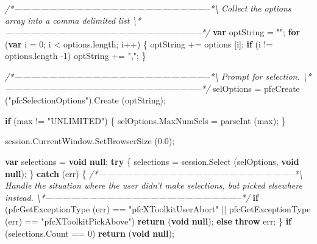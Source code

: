 \documentclass[]{article}
\newenvironment{Shaded}{}{}
\newcommand{\KeywordTok}[1]{\textcolor[rgb]{0.00,0.44,0.13}{\textbf{{#1}}}}
\newcommand{\DecValTok}[1]{\textcolor[rgb]{0.25,0.63,0.44}{{#1}}}
\newcommand{\FloatTok}[1]{\textcolor[rgb]{0.25,0.63,0.44}{{#1}}}
\newcommand{\StringTok}[1]{\textcolor[rgb]{0.25,0.44,0.63}{{#1}}}
\newcommand{\CommentTok}[1]{\textcolor[rgb]{0.38,0.63,0.69}{\textit{{#1}}}}
\newcommand{\OtherTok}[1]{\textcolor[rgb]{0.00,0.44,0.13}{{#1}}}
\newcommand{\FunctionTok}[1]{\textcolor[rgb]{0.02,0.16,0.49}{{#1}}}
\newcommand{\NormalTok}[1]{{#1}}
\begin{document}
\begin{Shaded}
\begin{Highlighting}[]
\CommentTok{/*--------------------------------------------------------------------*\textbackslash{} }
\CommentTok{  Collect the options array into a comma delimited list}
\CommentTok{\textbackslash{}*--------------------------------------------------------------------*/}  
  \KeywordTok{var} \NormalTok{optString = }\StringTok{""}\NormalTok{;}
  \KeywordTok{for} \NormalTok{(}\KeywordTok{var} \NormalTok{i = }\DecValTok{0}\NormalTok{; i < }\OtherTok{options}\NormalTok{.}\FunctionTok{length}\NormalTok{; i++)}
    \NormalTok{\{}
      \NormalTok{optString += options [i];}
      \KeywordTok{if} \NormalTok{(i != }\OtherTok{options}\NormalTok{.}\FunctionTok{length} \NormalTok{-}\DecValTok{1}\NormalTok{)}
    \NormalTok{optString += }\StringTok{","}\NormalTok{;}
    \NormalTok{\}}
  
\CommentTok{/*--------------------------------------------------------------------*\textbackslash{} }
\CommentTok{  Prompt for selection.}
\CommentTok{\textbackslash{}*--------------------------------------------------------------------*/}  
  \NormalTok{selOptions = }\FunctionTok{pfcCreate} \NormalTok{(}\StringTok{"pfcSelectionOptions"}\NormalTok{).}\FunctionTok{Create} \NormalTok{(optString);}
  
  \KeywordTok{if} \NormalTok{(max != }\StringTok{"UNLIMITED"}\NormalTok{)}
    \NormalTok{\{}
      \OtherTok{selOptions}\NormalTok{.}\FunctionTok{MaxNumSels} \NormalTok{= }\FunctionTok{parseInt} \NormalTok{(max);}
    \NormalTok{\}}
  
  \OtherTok{session}\NormalTok{.}\OtherTok{CurrentWindow}\NormalTok{.}\FunctionTok{SetBrowserSize} \NormalTok{(}\FloatTok{0.0}\NormalTok{);}
  
  \KeywordTok{var} \NormalTok{selections = }\KeywordTok{void} \KeywordTok{null}\NormalTok{;}
  \KeywordTok{try} \NormalTok{\{}
    \NormalTok{selections = }\OtherTok{session}\NormalTok{.}\FunctionTok{Select} \NormalTok{(selOptions, }\KeywordTok{void} \KeywordTok{null}\NormalTok{);}
  \NormalTok{\}}
  \KeywordTok{catch} \NormalTok{(err) \{}
\CommentTok{/*--------------------------------------------------------------------*\textbackslash{} }
\CommentTok{  Handle the situation where the  user didn't make selections, but picked }
\CommentTok{  elsewhere instead.}
\CommentTok{  \textbackslash{}*--------------------------------------------------------------------*/}  
    \KeywordTok{if} \NormalTok{(}\FunctionTok{pfcGetExceptionType} \NormalTok{(err) == }\StringTok{"pfcXToolkitUserAbort"} \NormalTok{|| }
    \FunctionTok{pfcGetExceptionType} \NormalTok{(err) == }\StringTok{"pfcXToolkitPickAbove"}\NormalTok{)}
      \KeywordTok{return} \NormalTok{(}\KeywordTok{void} \KeywordTok{null}\NormalTok{);}
    \KeywordTok{else}
      \KeywordTok{throw} \NormalTok{err;}
  \NormalTok{\}}
  \KeywordTok{if} \NormalTok{(}\OtherTok{selections}\NormalTok{.}\FunctionTok{Count} \NormalTok{== }\DecValTok{0}\NormalTok{)}
    \KeywordTok{return} \NormalTok{(}\KeywordTok{void} \KeywordTok{null}\NormalTok{);}
  

\end{Highlighting}
\end{Shaded}
\end{document}
